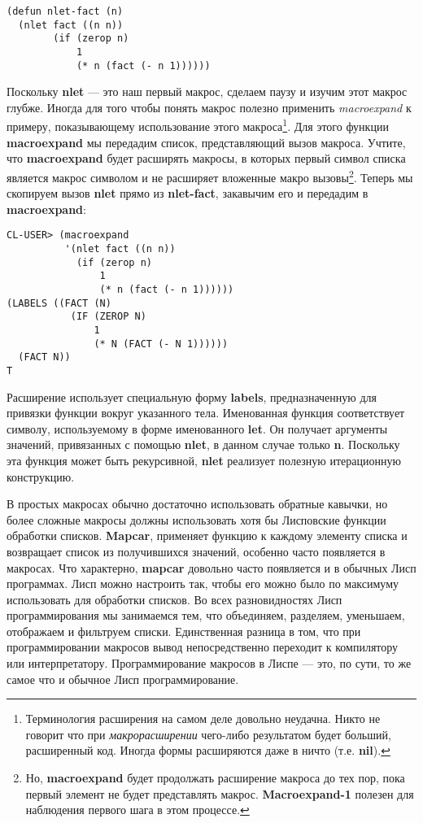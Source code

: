 \begin{verbatim}
(defun nlet-fact (n)
  (nlet fact ((n n))
        (if (zerop n)
            1
            (* n (fact (- n 1))))))
\end{verbatim}

Поскольку \textbf{nlet} --- это наш первый макрос, сделаем паузу и изучим этот макрос глубже. Иногда для того чтобы понять макрос полезно применить \emph{macroexpand} к примеру, показывающему использование этого макроса\footnote{Терминология расширения на самом деле довольно неудачна. Никто не говорит что при \emph{макрорасширении} чего-либо результатом будет больший, расширенный код. Иногда формы расширяются даже в ничто (т.е. \textbf{nil}).}. Для этого функции \textbf{macroexpand} мы передадим список, представляющий вызов макроса. Учтите, что \textbf{macroexpand} будет расширять макросы, в которых первый символ списка является макрос символом и не расширяет вложенные макро вызовы\footnote{Но, \textbf{macroexpand} будет продолжать расширение макроса до тех пор, пока первый элемент не будет представлять макрос. \textbf{Macroexpand-1} полезен для наблюдения первого шага в этом процессе.}. Теперь мы скопируем вызов \textbf{nlet} прямо из \textbf{nlet-fact}, закавычим его и передадим в \textbf{macroexpand}:

\begin{verbatim}
CL-USER> (macroexpand
          '(nlet fact ((n n))
            (if (zerop n)
                1
                (* n (fact (- n 1))))))
(LABELS ((FACT (N)
           (IF (ZEROP N)
               1
               (* N (FACT (- N 1))))))
  (FACT N))
T
\end{verbatim}

Расширение использует специальную форму \textbf{labels}, предназначенную для привязки функции вокруг указанного тела. Именованная функция соответствует символу, используемому в форме именованного \textbf{let}. Он получает аргументы значений, привязанных с помощью \textbf{nlet}, в данном случае только \textbf{n}. Поскольку эта функция может быть рекурсивной, \textbf{nlet} реализует полезную итерационную конструкцию.

В простых макросах обычно достаточно использовать обратные кавычки, но более сложные макросы должны использовать хотя бы Лисповские функции обработки списков. \textbf{Mapcar}, применяет функцию к каждому элементу списка и возвращает список из получившихся значений, особенно часто появляется в макросах. Что характерно, \textbf{mapcar} довольно часто появляется и в обычных Лисп программах. Лисп можно настроить так, чтобы его можно было по максимуму использовать для обработки списков. Во всех разновидностях Лисп программирования мы занимаемся тем, что объединяем, разделяем, уменьшаем, отображаем и фильтруем списки. Единственная разница в том, что при программировании макросов вывод непосредственно переходит к компилятору или интерпретатору. Программирование макросов в Лиспе --- это, по сути, то же самое что и обычное Лисп программирование.

